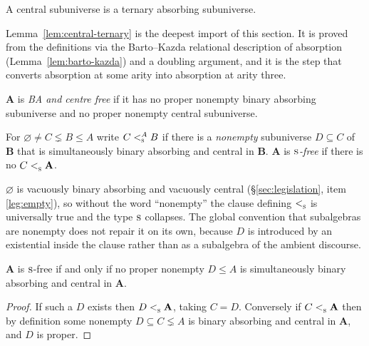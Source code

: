 \begin{lemma}\label{lem:central-ternary}
A central subuniverse is a ternary absorbing subuniverse.
\end{lemma}

\begin{remark}\label{rem:center-done}
Lemma~\ref{lem:central-ternary} is the deepest import of this section. It is
proved from the definitions via the Barto--Kazda relational description of
absorption (Lemma~\ref{lem:barto-kazda}) and a doubling argument, and it is the
step that converts absorption at some arity into absorption at arity three.
\end{remark}

\begin{definition}\label{def:ba-center-free}
$\mathbf A$ is \emph{BA and centre free} if it has no proper nonempty binary
absorbing subuniverse and no proper nonempty central subuniverse.

For $\varnothing\neq C\lneq B\le A$ write $C\subt[A]{\TS}B$ if there is a
\emph{nonempty} subuniverse $D\subseteq C$ of $\mathbf B$ that is
simultaneously binary absorbing and central in $\mathbf B$. $\mathbf A$ is
\emph{$\TS$-free} if there is no $C\subt{\TS}\mathbf A$.
\end{definition}

\begin{hazard}\label{haz:S-nonempty}
$\varnothing$ is vacuously binary absorbing and vacuously central
(\S\ref{sec:legislation}, item \ref{leg:empty}), so without the word
``nonempty'' the clause defining $\subt{\TS}$ is universally true and the type
$\TS$ collapses. The global convention that subalgebras are nonempty does not
repair it on its own, because $D$ is introduced by an existential inside the
clause rather than as a subalgebra of the ambient discourse.
\end{hazard}

\begin{lemma}\label{lem:sfree-equiv}
$\mathbf A$ is $\TS$-free if and only if no proper nonempty $D\le A$ is
simultaneously binary absorbing and central in $\mathbf A$.
\end{lemma}

\begin{proof}
If such a $D$ exists then $D\subt{\TS}\mathbf A$, taking $C=D$. Conversely if
$C\subt{\TS}\mathbf A$ then by definition some nonempty $D\subseteq C\lneq A$
is binary absorbing and central in $\mathbf A$, and $D$ is proper.
\end{proof}

